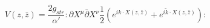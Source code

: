 \begin{equation}
V(z,\bar z)=\frac{2g_{str}}{\alpha'}:\partial X^\mu\bar\partial
X^\nu\frac{1}{2}\left( e^{ik\cdot X(z,\bar z)}
+ e^{i\tilde k\cdot X(z,\bar z)}\right):
\end{equation}

